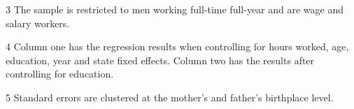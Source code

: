 \begin{table}[H]
\begin{threeparttable}
\begin{tablenotes}
\item[3] {\footnotesize{The sample is restricted to men working full-time full-year and are wage and salary workers.}}
\item[4] {\footnotesize{Column one has the regression results when controlling for hours worked, age, education, year and state fixed effects. Column two has the results after controlling for education.}}
\item[5] {\footnotesize{Standard errors are clustered at the mother's and father's birthplace level.}}
\end{tablenotes}
\end{threeparttable}
\end{table}
